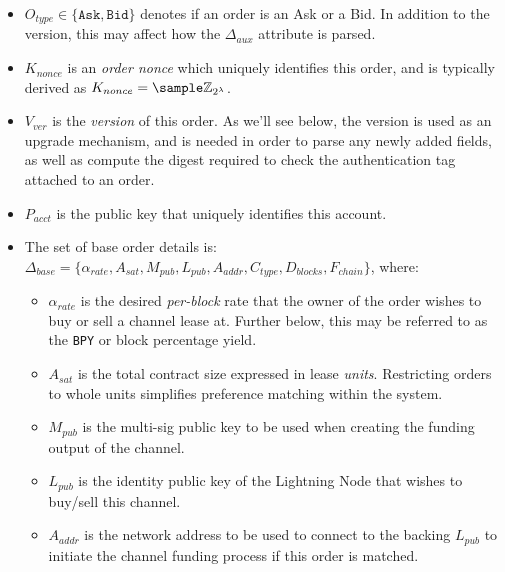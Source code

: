 \documentclass[10pt,a4paper]{article}
\theoremstyle{definition}
\begin{document}
\begin{itemize}
    \item $O_{type} \in \{\texttt{Ask}, \texttt{Bid}\}$ denotes if an order is
        an Ask or a Bid. In addition to the version, this may affect how the
        $\Delta_{aux}$ attribute is parsed.

    \item $K_{nonce}$ is an \emph{order nonce} which uniquely identifies this
        order, and is typically derived as $K_{nonce} = \sample
        \mathbb{Z}_{2^{\lambda}}$.

    \item $V_{ver}$ is the \emph{version} of this order. As we'll see below,
        the version is used as an upgrade mechanism, and is needed in order to
        parse any newly added fields, as well as compute the digest required to
        check the authentication tag attached to an order.

    \item $P_{acct}$ is the public key that uniquely identifies this account.

    \item The set of base order details is: \\ $\Delta_{base} = \{
        \alpha_{rate}, A_{sat}, M_{pub}, L_{pub}, A_{addr}, C_{type},
    D_{blocks}, F_{chain} \}$, where:

    \begin{itemize}

        \item $\alpha_{rate}$ is the desired \emph{per-block} rate that the
            owner of the order wishes to buy or sell a channel lease at.
            Further below, this may be referred to as the \texttt{BPY} or block
            percentage yield.

        \item $A_{sat}$ is the total contract size expressed in lease
            \emph{units}.  Restricting orders to whole units simplifies
            preference matching within the system.

        \item $M_{pub}$ is the multi-sig public key to be used when creating
            the funding output of the channel. %

        \item $L_{pub}$ is the identity public key of the Lightning
            Node that wishes to buy/sell this channel.

        \item $A_{addr}$ is the network address to be used to connect to the
            backing $L_{pub}$ to initiate the channel funding process if this
            order is matched. %


\end{itemize}
\end{itemize}
\end{document}

